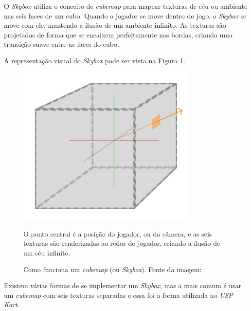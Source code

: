 O \textit{Skybox} utiliza o conceito de \textit{cubemap} para mapear texturas de céu ou ambiente nas seis faces de um cubo. Quando o jogador se move dentro do jogo, o \textit{Skybox} se move com ele, mantendo a ilusão de um ambiente infinito. As texturas são projetadas de forma que se encaixem perfeitamente nas bordas, criando uma transição suave entre as faces do cubo.

A representação visual do \textit{Skybox} pode ser vista na Figura \ref{fig:skybox}.

\begin{figure}[H]
    \centering
    \includegraphics[width=0.8\textwidth]{figuras/Skybox.png}
    \caption{Como funciona um \textit{cubemap} (ou \textit{Skybox}). Fonte da imagem: \cite{skybox}}
    \footnotesize{O ponto central é a posição do jogador, ou da câmera, e as seis texturas são renderizadas ao redor do jogador, criando a ilusão de um céu infinito.}
    \label{fig:skybox}
\end{figure}

Existem várias formas de se implementar um \textit{Skybox}, mas a mais comum é usar um \textit{cubemap} com seis texturas separadas e essa foi a forma utilizada no \textit{USP Kart}.

